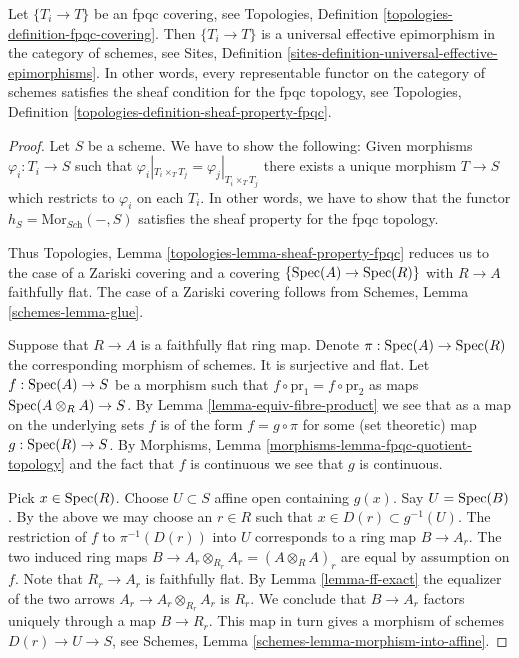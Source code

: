 \begin{lemma}
\label{lemma-fpqc-universal-effective-epimorphisms}
Let $\{T_i \to T\}$ be an fpqc covering, see
Topologies, Definition \ref{topologies-definition-fpqc-covering}.
Then $\{T_i \to T\}$ is a universal effective epimorphism
in the category of schemes, see
Sites, Definition \ref{sites-definition-universal-effective-epimorphisms}.
In other words, every representable functor on the category of schemes
satisfies the sheaf condition for the fpqc topology, see
Topologies, Definition \ref{topologies-definition-sheaf-property-fpqc}.
\end{lemma}

\begin{proof}
Let $S$ be a scheme. We have to show the following:
Given morphisms $\varphi_i : T_i \to S$
such that $\varphi_i|_{T_i\times_T T_j} = \varphi_j|_{T_i \times_T T_j}$
there exists a unique morphism $T \to S$ which restricts
to $\varphi_i$ on each $T_i$.
In other words, we have to show that the functor
$h_S = \text{Mor}_{\textit{Sch}}( - , S)$ satisfies
the sheaf property for the fpqc topology.

\medskip\noindent
Thus Topologies, Lemma \ref{topologies-lemma-sheaf-property-fpqc}
reduces us to the case of a Zariski covering and a covering
$\{\mathop{\rm Spec}(A) \to \mathop{\rm Spec}(R)\}$ with $R \to A$ faithfully flat.
The case of a Zariski covering follows from
Schemes, Lemma \ref{schemes-lemma-glue}.

\medskip\noindent
Suppose that $R \to A$ is a faithfully flat ring map.
Denote $\pi : \mathop{\rm Spec}(A) \to \mathop{\rm Spec}(R)$ the
corresponding morphism of schemes. It is surjective and flat.
Let $f : \mathop{\rm Spec}(A) \to S$ be a morphism
such that $f \circ \text{pr}_1 = f \circ \text{pr}_2$
as maps $\mathop{\rm Spec}(A \otimes_R A) \to S$.
By Lemma \ref{lemma-equiv-fibre-product} we see that
as a map on the underlying
sets $f$ is of the form $f = g \circ \pi$ for some
(set theoretic) map $g : \mathop{\rm Spec}(R) \to S$.
By Morphisms, Lemma \ref{morphisms-lemma-fpqc-quotient-topology}
and the fact that $f$ is continuous we see that $g$
is continuous.

\medskip\noindent
Pick $x \in \mathop{\rm Spec}(R)$.
Choose $U \subset S$ affine open containing $g(x)$.
Say $U = \mathop{\rm Spec}(B)$.
By the above we may choose an $r \in R$ such that
$x \in D(r) \subset g^{-1}(U)$.
The restriction of $f$ to $\pi^{-1}(D(r))$ into $U$
corresponds to a ring map $B \to A_r$. The two induced
ring maps $B \to A_r \otimes_{R_r} A_r = (A \otimes_R A)_r$ are equal
by assumption on $f$.
Note that $R_r \to A_r$ is faithfully flat.
By Lemma \ref{lemma-ff-exact} the equalizer of
the two arrows $A_r \to A_r \otimes_{R_r} A_r$ is $R_r$.
We conclude that $B \to A_r$ factors uniquely through a map $B \to R_r$.
This map in turn gives a morphism of schemes $D(r) \to U \to S$,
see Schemes, Lemma \ref{schemes-lemma-morphism-into-affine}.


\end{proof}
